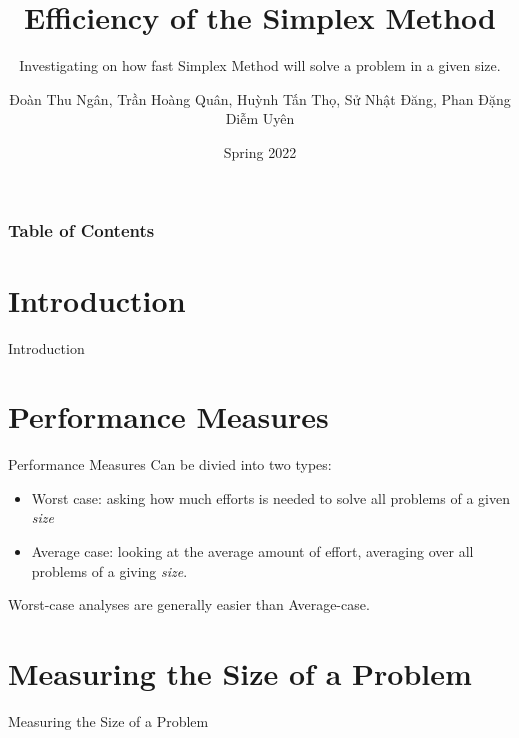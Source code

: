 \documentclass[10pt]{beamer}
\begin{document}
\author{Đoàn Thu Ngân, Trần Hoàng Quân, Huỳnh Tấn Thọ, Sử Nhật Đăng, Phan Đặng Diễm Uyên}
\title{Efficiency of the Simplex Method}
\subtitle{Investigating on how fast Simplex Method will solve a problem in a given size.}
\date{Spring 2022}
\subject{CSC10104 - Linear Programming}


\begin{frame}[plain]
\maketitle
\end{frame}

\begin{frame}
\frametitle{Table of Contents}
\tableofcontents
\end{frame}

\section{Introduction}
\begin{frame}{Introduction}

\end{frame}

\section{Performance Measures}
\begin{frame}{Performance Measures}
Can be divied into two types:
\begin{itemize}
\item Worst case: asking how much efforts is needed to solve all problems of a given \textit{size}
\item Average case: looking at the average amount of effort, averaging over all problems of a giving \textit{size}. 
\end{itemize}
Worst-case analyses are generally easier than Average-case.
\end{frame}

\section{Measuring the Size of a Problem}
\begin{frame}{Measuring the Size of a Problem}

\end{frame}
\end{document}
